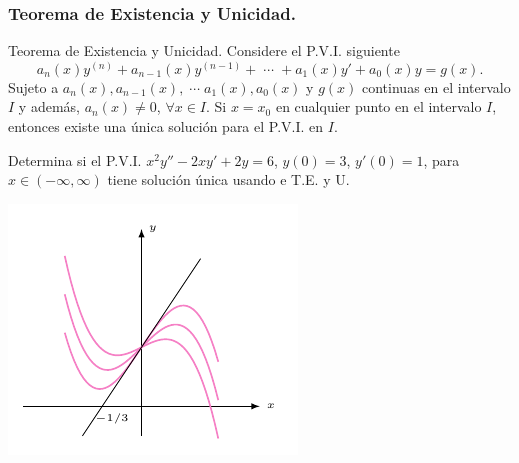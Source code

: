 \documentclass{beamer}
\begin{document}
\frame{\titlepage}

\begin{frame}[t]
	\frametitle{Teorema de Existencia y Unicidad.}
\begin{block}{Teorema de Existencia y Unicidad.}
	Considere el P.V.I. siguiente
	\[
		a_n(x) y^{(n)} + a_{n-1} (x) y^{(n-1)} + \;\cdots\; + a_1(x) y' +a_0(x) y = g(x).
	\]
	Sujeto a \(a_n(x) , a_{n-1} (x) , \;\cdots\; a_1(x) ,a_0(x)\) y \(g(x)\) continuas en el intervalo \(I\) y además, \(a_n(x) \ne 0\), \(\forall x \in I\). Si \(x=x_0\) en cualquier punto en el intervalo \(I\), entonces existe una única solución para el P.V.I. en \(I\).
\end{block}
	\begin{example}
		Determina si el P.V.I. \(x^2y'' -2xy' +2y=6\), \(y(0) =3\), \(y' (0) =1\), para \(x \in (- \infty , \infty)\) tiene solución única usando e T.E. y U.
	\end{example}
\end{frame}
\begin{frame}[t]
\end{frame}

\begin{frame}[t]
	\begin{minipage}{0.6\linewidth}
		\includegraphics[width= \linewidth]{IMAGENES/6/tikz.pdf}
	\end{minipage}
	\begin{minipage}{0.3\linewidth}
	\end{minipage}
\end{frame}
\end{document}
